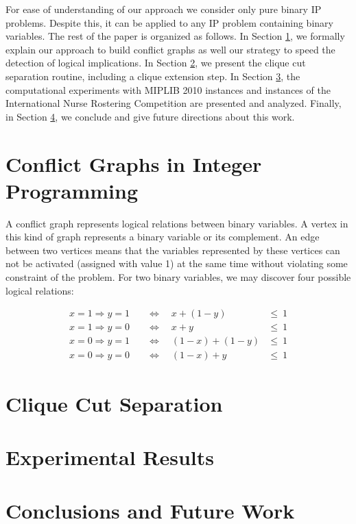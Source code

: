 \documentclass{endm}
\begin{document}
For ease of understanding of our approach we consider only pure binary IP problems. Despite this, it can be applied to any IP problem containing binary variables. The rest of the paper is organized as follows. In Section \ref{graph}, we formally explain our approach to build conflict graphs as well our strategy to speed the detection of logical implications. In Section \ref{cut}, we present the clique cut separation routine, including a clique extension step. In Section \ref{experiments}, the computational experiments with MIPLIB 2010 instances \cite{miplib} and instances of the International Nurse Rostering Competition \cite{haspeslagh} are presented and analyzed. Finally, in Section \ref{conclusions}, we conclude and give future directions about this work.

\section{Conflict Graphs in Integer Programming}\label{graph}

A conflict graph represents logical relations between binary variables. A vertex in this kind of graph represents a binary variable or its complement. An edge between two vertices means that the variables represented by these vertices can not be activated (assigned with value 1) at the same time without violating some constraint of the problem. For two binary variables, we may discover four possible logical relations:

\begin{align}
x = 1 \Rightarrow y = 1 & \quad \Longleftrightarrow \quad x + (1 - y) & \leq \ 1\\
x = 1 \Rightarrow y = 0 & \quad \Longleftrightarrow \quad x + y & \leq \ 1 \\
x = 0 \Rightarrow y = 1 & \quad \Longleftrightarrow \quad (1 - x) + (1 - y) & \leq \ 1 \\
x = 0 \Rightarrow y = 0 & \quad \Longleftrightarrow \quad (1 - x) + y & \leq \ 1
\end{align}

\section{Clique Cut Separation}\label{cut}
\section{Experimental Results}\label{experiments}
\section{Conclusions and Future Work}\label{conclusions}



\end{document}
